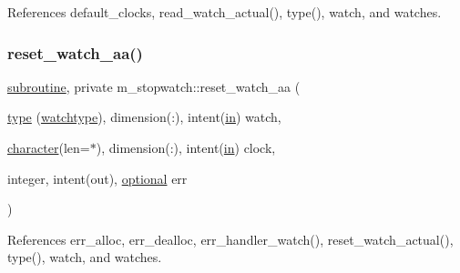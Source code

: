 References default\+\_\+clocks, read\+\_\+watch\+\_\+actual(), type(), watch, and watches.

\mbox{\label{namespacem__stopwatch_ab6cfebb215292cc061f472aedb2dbb93}} 
\subsubsection{\texorpdfstring{reset\+\_\+watch\+\_\+aa()}{reset\_watch\_aa()}}
{\footnotesize\ttfamily \hyperlink{M__stopwatch_83_8txt_acfbcff50169d691ff02d4a123ed70482}{subroutine}, private m\+\_\+stopwatch\+::reset\+\_\+watch\+\_\+aa (\begin{DoxyParamCaption}\item[{\hyperlink{stop__watch_83_8txt_a70f0ead91c32e25323c03265aa302c1c}{type} (\hyperlink{structm__stopwatch_1_1watchtype}{watchtype}), dimension(\+:), intent(\hyperlink{M__journal_83_8txt_afce72651d1eed785a2132bee863b2f38}{in})}]{watch,  }\item[{\hyperlink{option__stopwatch_83_8txt_abd4b21fbbd175834027b5224bfe97e66}{character}(len=$\ast$), dimension(\+:), intent(\hyperlink{M__journal_83_8txt_afce72651d1eed785a2132bee863b2f38}{in})}]{clock,  }\item[{integer, intent(out), \hyperlink{option__stopwatch_83_8txt_aa4ece75e7acf58a4843f70fe18c3ade5}{optional}}]{err }\end{DoxyParamCaption})\hspace{0.3cm}{\ttfamily [private]}}



References err\+\_\+alloc, err\+\_\+dealloc, err\+\_\+handler\+\_\+watch(), reset\+\_\+watch\+\_\+actual(), type(), watch, and watches.

\mbox{\label{namespacem__stopwatch_a70b2f142c88aae3054e06c0884197de2}} 
